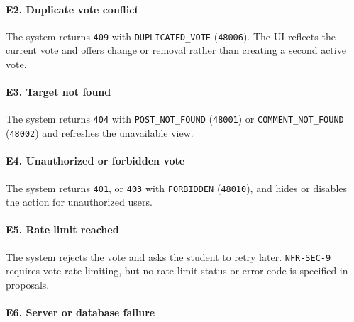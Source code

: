 \documentclass[12pt]{article}
\begin{document}
\hypertarget{sec:e2-duplicate-vote-conflict}{}
\paragraph*{E2. Duplicate vote conflict}
\par\medskip

The system returns \texttt{409} with \texttt{DUPLICATED\_VOTE} (\texttt{48006}). The UI reflects the current vote and offers change or removal rather than creating a second active vote.
\par\medskip

\hypertarget{sec:e3-target-not-found}{}
\paragraph*{E3. Target not found}
\par\medskip

The system returns \texttt{404} with \texttt{POST\_NOT\_FOUND} (\texttt{48001}) or \texttt{COMMENT\_NOT\_FOUND} (\texttt{48002}) and refreshes the unavailable view.
\par\medskip

\hypertarget{sec:e4-unauthorized-or-forbidden-vote}{}
\paragraph*{E4. Unauthorized or forbidden vote}
\par\medskip

The system returns \texttt{401}, or \texttt{403} with \texttt{FORBIDDEN} (\texttt{48010}), and hides or disables the action for unauthorized users.
\par\medskip

\hypertarget{sec:e5-rate-limit-reached}{}
\paragraph*{E5. Rate limit reached}
\par\medskip

The system rejects the vote and asks the student to retry later. \texttt{NFR-SEC-9} requires vote rate limiting, but no rate-limit status or error code is specified in proposals.
\par\medskip

\hypertarget{sec:e6-server-or-database-failure}{}
\paragraph*{E6. Server or database failure}
\par\medskip
\end{document}
